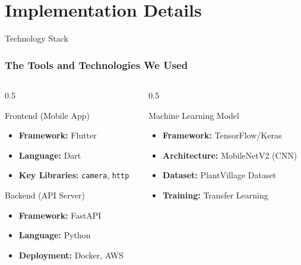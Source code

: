 \documentclass{beamer}
\begin{document}
\section{Implementation Details}
\begin{frame}{Technology Stack}
    \frametitle{The Tools and Technologies We Used}
    \begin{columns}
        \begin{column}{0.5\textwidth}
            \begin{block}{Frontend (Mobile App)}
                \begin{itemize}
                    \item \textbf{Framework:} Flutter
                    \item \textbf{Language:} Dart
                    \item \textbf{Key Libraries:} \texttt{camera}, \texttt{http}
                \end{itemize}
            \end{block}
            
            \begin{block}{Backend (API Server)}
                \begin{itemize}
                    \item \textbf{Framework:} FastAPI
                    \item \textbf{Language:} Python
                    \item \textbf{Deployment:} Docker, AWS
                \end{itemize}
            \end{block}
        \end{column}
        
        \begin{column}{0.5\textwidth}
            \begin{block}{Machine Learning Model}
                \begin{itemize}
                    \item \textbf{Framework:} TensorFlow/Keras
                    \item \textbf{Architecture:} MobileNetV2 (CNN)
                    \item \textbf{Dataset:} PlantVillage Dataset
                    \item \textbf{Training:} Transfer Learning
                \end{itemize}
            \end{block}
        \end{column}
    \end{columns}
\end{frame}
\end{document}
